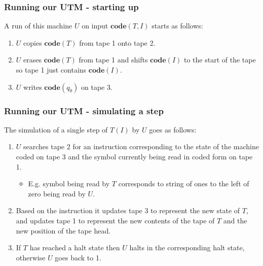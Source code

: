 \documentclass[handout]{beamer}
\newcommand{\co}{\mathbf{code}}
\begin{document}
\begin{frame}
\frametitle{Running our UTM - starting up}
A run of this machine $U$ on input $\co(T,I)$ starts as follows:
\vspace{0.3cm}
\begin{enumerate}
\item $U$ copies $\co(T)$ from tape 1 onto tape 2.
\vspace{0.3cm}
\item $U$ erases $\co(T)$ from tape 1 and shifts $\co(I)$ to the start of the tape so tape 1 just contains $\co(I)$.
\vspace{0.3cm}
\item $U$ writes $\co(q_0)$ on tape 3.
\end{enumerate}
\end{frame}

\begin{frame}
\frametitle{Running our UTM - simulating a step}
The simulation of a single step of $T(I)$ by $U$ goes as follows:

\begin{enumerate}
\item $U$ searches tape 2 for an instruction corresponding to the state of the machine coded on tape 3 and the symbol currently being read in coded form on tape 1. 
\begin{itemize}
\item E.g. symbol being read by $T$ corresponds to string of ones to the left of zero being read by $U$. 
\end{itemize}
\item Based on the instruction it updates tape 3 to represent the new state of $T$, and updates tape 1 to represent the new contents of the tape of $T$ and the new position of the tape head.
\item If $T$ has reached a halt state then $U$ halts in the corresponding halt state, otherwise $U$ goes back to 1.
\end{enumerate}
\end{frame}
\end{document}
